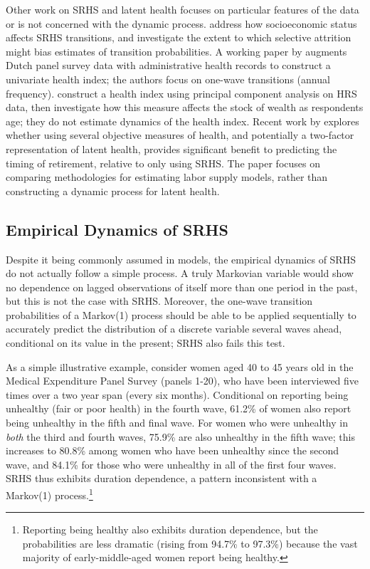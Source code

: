 \documentclass[12pt,pdftex,letterpaper]{article}
\begin{document}
Other work on SRHS and latent health focuses on particular features of the data or is not concerned with the dynamic process.  \cite{Contoyannis04} address how socioeconomic status affects SRHS transitions, and investigate the extent to which selective attrition might bias estimates of transition probabilities.  A working paper by \cite{Alessie15} augments Dutch panel survey data with administrative health records to construct a univariate health index; the authors focus on one-wave transitions (annual frequency). \cite{Poterba17} construct a health index using principal component analysis on HRS data, then investigate how this measure affects the stock of wealth as respondents age; they do not estimate dynamics of the health index. Recent work by \cite{Blundell17} explores whether using several objective measures of health, and potentially a two-factor representation of latent health, provides significant benefit to predicting the timing of retirement, relative to only using SRHS.  The paper focuses on comparing methodologies for estimating labor supply models, rather than constructing a dynamic process for latent health.


\subsection{Empirical Dynamics of SRHS}

Despite it being commonly assumed in models, the empirical dynamics of SRHS do not actually follow a simple process. A truly Markovian variable would show no dependence on lagged observations of itself more than one period in the past, but this is not the case with SRHS.  Moreover, the one-wave transition probabilities of a Markov(1) process should be able to be applied sequentially to accurately predict the distribution of a discrete variable several waves ahead, conditional on its value in the present; SRHS also fails this test.

As a simple illustrative example, consider women aged 40 to 45 years old in the Medical Expenditure Panel Survey (panels 1-20), who have been interviewed five times over a two year span (every six months).  Conditional on reporting being unhealthy (fair or poor health) in the fourth wave, 61.2\% of women also report being unhealthy in the fifth and final wave.  For women who were unhealthy in \textit{both} the third and fourth waves, 75.9\% are also unhealthy in the fifth wave; this increases to 80.8\% among women who have been unhealthy since the second wave, and 84.1\% for those who were unhealthy in all of the first four waves.  SRHS thus exhibits duration dependence, a pattern inconsistent with a Markov(1) process.\footnote{Reporting being  healthy also exhibits duration dependence, but the probabilities are less dramatic (rising from 94.7\% to 97.3\%) because the vast majority of early-middle-aged women report being healthy.}
\end{document}
